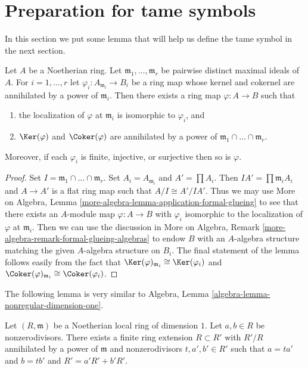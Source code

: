 \section{Preparation for tame symbols}
\label{section-preparation-tame-symbol}

\noindent
In this section we put some lemma that will help us define the
tame symbol in the next section.

\begin{lemma}
\label{lemma-glue-at-max}
Let $A$ be a Noetherian ring. Let $\mathfrak m_1, \ldots, \mathfrak m_r$
be pairwise distinct maximal ideals of $A$. For $i = 1, \ldots, r$ let
$\varphi_i : A_{\mathfrak m_i} \to B_i$ be a ring map whose
kernel and cokernel are annihilated by a power
of $\mathfrak m_i$. Then there exists a ring map $\varphi : A \to B$ such
that
\begin{enumerate}
\item the localization of $\varphi$ at $\mathfrak m_i$ is
isomorphic to $\varphi_i$, and
\item $\Ker(\varphi)$ and $\Coker(\varphi)$ are annihilated
by a power of $\mathfrak m_1 \cap \ldots \cap \mathfrak m_r$.
\end{enumerate}
Moreover, if each $\varphi_i$ is finite, injective, or
surjective then so is $\varphi$.
\end{lemma}

\begin{proof}
Set $I = \mathfrak m_1 \cap \ldots \cap \mathfrak m_r$. Set
$A_i = A_{\mathfrak m_i}$ and $A' = \prod A_i$.
Then $IA' = \prod \mathfrak m_i A_i$ and $A \to A'$
is a flat ring map such that $A/I \cong A'/IA'$.
Thus we may use More on Algebra, Lemma
\ref{more-algebra-lemma-application-formal-glueing}
to see that there exists an $A$-module map $\varphi : A \to B$
with $\varphi_i$ isomorphic to the localization of $\varphi$
at $\mathfrak m_i$. Then we can use the discussion in
More on Algebra, Remark \ref{more-algebra-remark-formal-glueing-algebras}
to endow $B$ with an $A$-algebra structure
matching the given $A$-algebra structure on $B_i$.
The final statement of the lemma follows easily from
the fact that $\Ker(\varphi)_{\mathfrak m_i} \cong \Ker(\varphi_i)$
and $\Coker(\varphi)_{\mathfrak m_i} \cong \Coker(\varphi_i)$.
\end{proof}

\noindent
The following lemma is very similar to
Algebra, Lemma \ref{algebra-lemma-nonregular-dimension-one}.

\begin{lemma}
\label{lemma-Noetherian-domain-dim-1-two-elements}
Let $(R, \mathfrak m)$ be a Noetherian local ring of dimension $1$.
Let $a, b \in R$ be nonzerodivisors.
There exists a finite ring extension $R \subset R'$
with $R'/R$ annihilated by a power of $\mathfrak m$
and nonzerodivisors $t, a', b' \in R'$ such that
$a = ta'$ and $b = tb'$ and $R' = a'R' + b'R'$.
\end{lemma}


